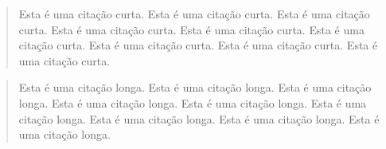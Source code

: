 \begin{quote} %
	Esta é uma citação curta. Esta é uma citação curta. Esta é uma citação curta.
	Esta é uma citação curta. Esta é uma citação curta. Esta é uma citação curta.
	Esta é uma citação curta. Esta é uma citação curta. Esta é uma citação curta.
\end{quote}

\begin{quotation} %
	Esta é uma citação longa. Esta é uma citação longa. Esta é uma citação longa.
	Esta é uma citação longa. Esta é uma citação longa. Esta é uma citação longa.
	Esta é uma citação longa. Esta é uma citação longa. Esta é uma citação longa.
\end{quotation}

